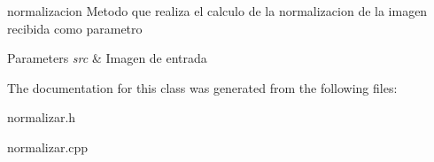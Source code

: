 normalizacion Metodo que realiza el calculo de la normalizacion de la imagen recibida como parametro 


\begin{DoxyParams}{Parameters}
{\em src} & Imagen de entrada \\
\hline
\end{DoxyParams}


The documentation for this class was generated from the following files\+:\begin{DoxyCompactItemize}
\item 
normalizar.\+h\item 
normalizar.\+cpp\end{DoxyCompactItemize}
